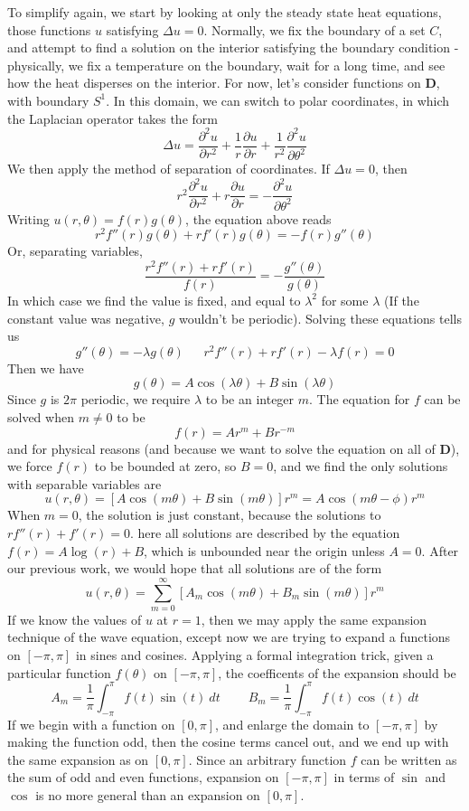 To simplify again, we start by looking at only the steady state heat equations, those functions $u$ satisfying $\Delta u = 0$. Normally, we fix the boundary of a set $C$, and attempt to find a solution on the interior satisfying the boundary condition - physically, we fix a temperature on the boundary, wait for a long time, and see how the heat disperses on the interior. For now, let's consider functions on $\mathbf{D}$, with boundary $S^1$. In this domain, we can switch to polar coordinates, in which the Laplacian operator takes the form
%
\[ \Delta u = \frac{\partial^2 u}{\partial r^2} + \frac{1}{r} \frac{\partial u}{\partial r} + \frac{1}{r^2} \frac{\partial^2 u}{\partial \theta^2} \]
%
We then apply the method of separation of coordinates. If $\Delta u = 0$, then
%
\[ r^2 \frac{\partial^2 u}{\partial r^2} + r \frac{\partial u}{\partial r} = - \frac{\partial^2 u}{\partial \theta^2} \]
%
Writing $u(r,\theta) = f(r)g(\theta)$, the equation above reads
%
\[ r^2 f''(r) g(\theta) + r f'(r) g(\theta) = - f(r) g''(\theta) \]
%
Or, separating variables,
%
\[ \frac{r^2 f''(r) + r f'(r)}{f(r)} = - \frac{g''(\theta)}{g(\theta)} \]
%
In which case we find the value is fixed, and equal to $\lambda^2$ for some $\lambda$ (If the constant value was negative, $g$ wouldn't be periodic). Solving these equations tells us
%
\[ g''(\theta) = - \lambda g(\theta)\ \ \ \ \ \ \ r^2 f''(r) + r f'(r) - \lambda f(r) = 0 \]
%
Then we have
%
\[ g(\theta) = A \cos(\lambda \theta) + B \sin(\lambda \theta) \]
%
Since $g$ is $2\pi$ periodic, we require $\lambda$ to be an integer $m$. The equation for $f$ can be solved when $m \neq 0$ to be
%
\[ f(r) = A r^m + B r^{-m} \]
%
and for physical reasons (and because we want to solve the equation on all of $\mathbf{D}$), we force $f(r)$ to be bounded at zero, so $B = 0$, and we find the only solutions with separable variables are
%
\[ u(r,\theta) = [A \cos(m \theta) + B \sin(m \theta)] r^m = A \cos(m \theta - \phi) r^m \]
%
When $m = 0$, the solution is just constant, because the solutions to $r f''(r) + f'(r) = 0$. here all solutions are described by the equation $f(r) = A \log(r) + B$, which is unbounded near the origin unless $A = 0$. After our previous work, we would hope that all solutions are of the form
%
\[ u(r,\theta) = \sum_{m = 0}^\infty [A_m \cos(m \theta) + B_m \sin(m \theta)] r^m \]
%
If we know the values of $u$ at $r = 1$, then we may apply the same expansion technique of the wave equation, except now we are trying to expand a functions on $[-\pi,\pi]$ in sines and cosines. Applying a formal integration trick, given a particular function $f(\theta)$ on $[-\pi,\pi]$, the coefficents of the expansion should be
%
\[ A_m = \frac{1}{\pi} \int_{-\pi}^\pi f(t) \sin(t)\ dt\ \ \ \ \ \ \ \ \ \ B_m = \frac{1}{\pi} \int_{-\pi}^\pi f(t) \cos(t)\ dt \]
%
If we begin with a function on $[0,\pi]$, and enlarge the domain to $[-\pi,\pi]$ by making the function odd, then the cosine terms cancel out, and we end up with the same expansion as on $[0,\pi]$. Since an arbitrary function $f$ can be written as the sum of odd and even functions, expansion on $[-\pi,\pi]$ in terms of $\sin$ and $\cos$ is no more general than an expansion on $[0,\pi]$.

